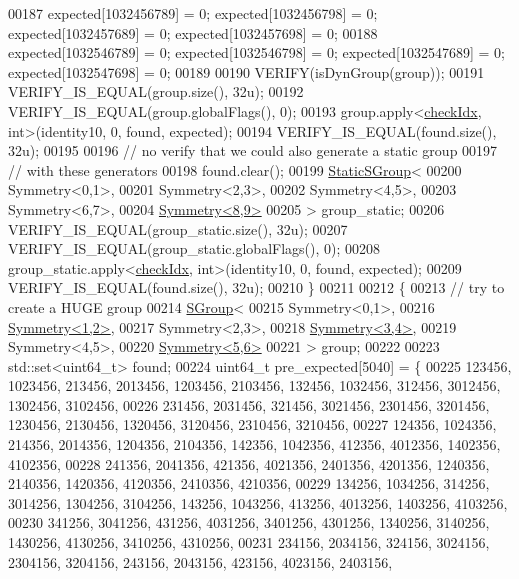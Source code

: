 \begin{DoxyCode}
00187     expected[1032456789] = 0; expected[1032456798] = 0; expected[1032457689] = 0; expected[1032457698] = 0;
00188     expected[1032546789] = 0; expected[1032546798] = 0; expected[1032547689] = 0; expected[1032547698] = 0;
00189 
00190     VERIFY(isDynGroup(group));
00191     VERIFY\_IS\_EQUAL(group.size(), 32u);
00192     VERIFY\_IS\_EQUAL(group.globalFlags(), 0);
00193     group.apply<\hyperlink{structcheck_idx}{checkIdx}, \textcolor{keywordtype}{int}>(identity10, 0, found, expected);
00194     VERIFY\_IS\_EQUAL(found.size(), 32u);
00195 
00196     \textcolor{comment}{// no verify that we could also generate a static group}
00197     \textcolor{comment}{// with these generators}
00198     found.clear();
00199     \hyperlink{class_eigen_1_1_static_s_group}{StaticSGroup}<
00200       Symmetry<0,1>,
00201       Symmetry<2,3>,
00202       Symmetry<4,5>,
00203       Symmetry<6,7>,
00204       \hyperlink{struct_eigen_1_1_symmetry}{Symmetry<8,9>}
00205     > group\_static;
00206     VERIFY\_IS\_EQUAL(group\_static.size(), 32u);
00207     VERIFY\_IS\_EQUAL(group\_static.globalFlags(), 0);
00208     group\_static.apply<\hyperlink{structcheck_idx}{checkIdx}, \textcolor{keywordtype}{int}>(identity10, 0, found, expected);
00209     VERIFY\_IS\_EQUAL(found.size(), 32u);
00210   \}
00211 
00212   \{
00213     \textcolor{comment}{// try to create a HUGE group}
00214     \hyperlink{class_eigen_1_1_s_group}{SGroup}<
00215       Symmetry<0,1>,
00216       \hyperlink{struct_eigen_1_1_symmetry}{Symmetry<1,2>},
00217       Symmetry<2,3>,
00218       \hyperlink{struct_eigen_1_1_symmetry}{Symmetry<3,4>},
00219       Symmetry<4,5>,
00220       \hyperlink{struct_eigen_1_1_symmetry}{Symmetry<5,6>}
00221     > group;
00222 
00223     std::set<uint64\_t> found;
00224     uint64\_t pre\_expected[5040] = \{
00225        123456, 1023456,  213456, 2013456, 1203456, 2103456,  132456, 1032456,  312456, 3012456, 1302456, 
      3102456,
00226        231456, 2031456,  321456, 3021456, 2301456, 3201456, 1230456, 2130456, 1320456, 3120456, 2310456, 
      3210456,
00227        124356, 1024356,  214356, 2014356, 1204356, 2104356,  142356, 1042356,  412356, 4012356, 1402356, 
      4102356,
00228        241356, 2041356,  421356, 4021356, 2401356, 4201356, 1240356, 2140356, 1420356, 4120356, 2410356, 
      4210356,
00229        134256, 1034256,  314256, 3014256, 1304256, 3104256,  143256, 1043256,  413256, 4013256, 1403256, 
      4103256,
00230        341256, 3041256,  431256, 4031256, 3401256, 4301256, 1340256, 3140256, 1430256, 4130256, 3410256, 
      4310256,
00231        234156, 2034156,  324156, 3024156, 2304156, 3204156,  243156, 2043156,  423156, 4023156, 2403156, 

\end{DoxyCode}
